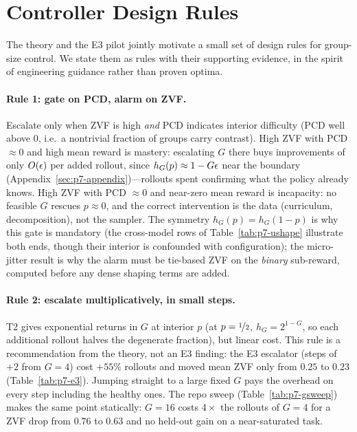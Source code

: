 \section{Controller Design Rules}
\label{sec:p7-rules}
The theory and the E3 pilot jointly motivate a small set of design rules for
group-size control. We state them as rules with their supporting evidence,
in the spirit of engineering guidance rather than proven optima.

\paragraph{Rule 1: gate on PCD, alarm on ZVF.} Escalate only when ZVF is
high \emph{and} PCD indicates interior difficulty (PCD well above $0$, i.e.\
a nontrivial fraction of groups carry contrast). High ZVF with PCD
$\approx 0$ and high mean reward is mastery: escalating $G$ there buys
improvements of only $O(\epsilon)$ per added rollout, since
$h_G(p) \approx 1 - G\epsilon$ near the boundary
(Appendix~\ref{sec:p7-appendix})---rollouts spent confirming what the policy
already knows. High ZVF with PCD $\approx 0$ and near-zero mean reward is
incapacity: no feasible $G$ rescues $p \approx 0$, and the correct
intervention is the data (curriculum, decomposition), not the sampler.
The symmetry $h_G(p)=h_G(1-p)$ is why this gate is mandatory (the
cross-model rows of Table~\ref{tab:p7-ushape} illustrate both ends, though
their interior is confounded with configuration); the micro-jitter result is why the alarm must be
tie-based ZVF on the \emph{binary} sub-reward, computed before any dense
shaping terms are added.

\paragraph{Rule 2: escalate multiplicatively, in small steps.} T2 gives
exponential returns in $G$ at interior $p$ (at $p = \nicefrac12$,
$h_G = 2^{1-G}$, so each additional rollout halves the degenerate
fraction), but linear cost. This rule is a recommendation from the theory, not an E3 finding: the E3
escalator (steps of $+2$ from $G{=}4$) cost $+55\%$ rollouts and moved mean
ZVF only from $0.25$ to $0.23$ (Table~\ref{tab:p7-e3}). Jumping straight to
a large fixed $G$ pays the overhead on every step including the healthy
ones. The repo sweep
(Table~\ref{tab:p7-gsweep}) makes the same point statically: $G{=}16$ costs
$4\times$ the rollouts of $G{=}4$ for a ZVF drop from $0.76$ to $0.63$ and
no held-out gain on a near-saturated task.

